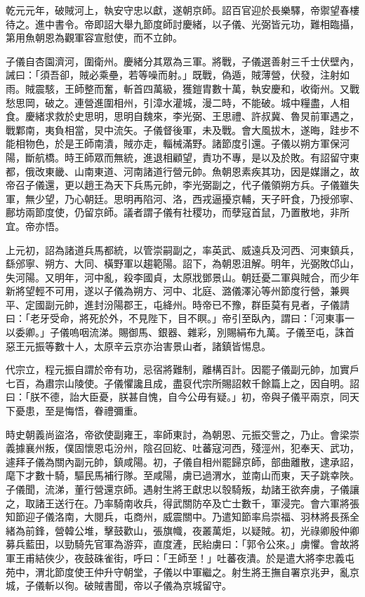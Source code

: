 \begin{pinyinscope}
 乾元元年，破賊河上，執安守忠以獻，遂朝京師。詔百官迎於長樂驛，帝禦望春樓待之。進中書令。帝即詔大舉九節度師討慶緒，以子儀、光弼皆元功，難相臨攝，第用魚朝恩為觀軍容宣慰使，而不立帥。



 子儀自杏園濟河，圍衛州。慶緒分其眾為三軍。將戰，子儀選善射三千士伏壁內，誡曰：「須吾卻，賊必乘壘，若等噪而射。」既戰，偽遁，賊薄營，伏發，注射如雨。賊震駭，王師整而奮，斬首四萬級，獲鎧胄數十萬，執安慶和，收衛州。又戰愁思岡，破之。連營進圍相州，引漳水灌城，漫二時，不能破。城中糧盡，人相食。慶緒求救於史思明，思明自魏來，李光弼、王思禮、許叔冀、魯炅前軍遇之，戰鄴南，夷負相當，炅中流矢。子儀督後軍，未及戰。會大風拔木，遂晦，跬步不能相物色，於是王師南潰，賊亦走，輜械滿野。諸節度引還。子儀以朔方軍保河陽，斷航橋。時王師眾而無統，進退相顧望，責功不專，是以及於敗。有詔留守東都，俄改東畿、山南東道、河南諸道行營元帥。魚朝恩素疾其功，因是媒譖之，故帝召子儀還，更以趙王為天下兵馬元帥，李光弼副之，代子儀領朔方兵。子儀雖失軍，無少望，乃心朝廷。思明再陷河、洛，西戎逼擾京輔，天子旰食，乃授邠寧、鄜坊兩節度使，仍留京師。議者謂子儀有社稷功，而孽寇首鼠，乃置散地，非所宜。帝亦悟。



 上元初，詔為諸道兵馬都統，以管崇嗣副之，率英武、威遠兵及河西、河東鎮兵，繇邠寧、朔方、大同、橫野軍以趨範陽。詔下，為朝恩沮解。明年，光弼敗邙山，失河陽。又明年，河中亂，殺李國貞，太原戕鄧景山。朝廷憂二軍與賊合，而少年新將望輕不可用，遂以子儀為朔方、河中、北庭、潞儀澤沁等州節度行營，兼興平、定國副元帥，進封汾陽郡王，屯絳州。時帝已不豫，群臣莫有見者，子儀請曰：「老牙受命，將死於外，不見陛下，目不瞑。」帝引至臥內，謂曰：「河東事一以委卿。」子儀嗚咽流涕。賜御馬、銀器、雜彩，別賜絹布九萬。子儀至屯，誅首惡王元振等數十人，太原辛云京亦治害景山者，諸鎮皆惕息。



 代宗立，程元振自謂於帝有功，忌宿將難制，離構百計。因罷子儀副元帥，加實戶七百，為肅宗山陵使。子儀懼讒且成，盡裒代宗所賜詔敕千餘篇上之，因自明。詔曰：「朕不德，詒大臣憂，朕甚自愧，自今公毋有疑。」初，帝與子儀平兩京，同天下憂患，至是悔悟，眷禮彌重。



 時史朝義尚盜洛，帝欲使副雍王，率師東討，為朝恩、元振交訾之，乃止。會梁崇義據襄州叛，僕固懷恩屯汾州，陰召回紇、吐蕃寇河西，殘涇州，犯奉天、武功，遽拜子儀為關內副元帥，鎮咸陽。初，子儀自相州罷歸京師，部曲離散，逮承詔，麾下才數十騎，驅民馬補行隊。至咸陽，虜已過渭水，並南山而東，天子跳幸陜。子儀聞，流涕，董行營還京師。遇射生將王獻忠以彀騎叛，劫諸王欲奔虜，子儀讓之，取諸王送行在。乃率騎南收兵，得武關防卒及亡士數千，軍浸完。會六軍將張知節迎子儀洛南，大閱兵，屯商州，威震關中。乃遣知節率烏崇福、羽林將長孫全緒為前鋒，營韓公堆，擊鼓歡山，張旗幟，夜叢萬炬，以疑賊。初，光祿卿殷仲卿募兵藍田，以勁騎先官軍為游弈，直度滻，民紿虜曰：「郭令公來。」虜懼。會故將軍王甫結俠少，夜鼓硃雀街，呼曰：「王師至！」吐蕃夜潰。於是遣大將李忠義屯苑中，渭北節度使王仲升守朝堂，子儀以中軍繼之。射生將王撫自署京兆尹，亂京城，子儀斬以徇。破賊書聞，帝以子儀為京城留守。




\end{pinyinscope}
